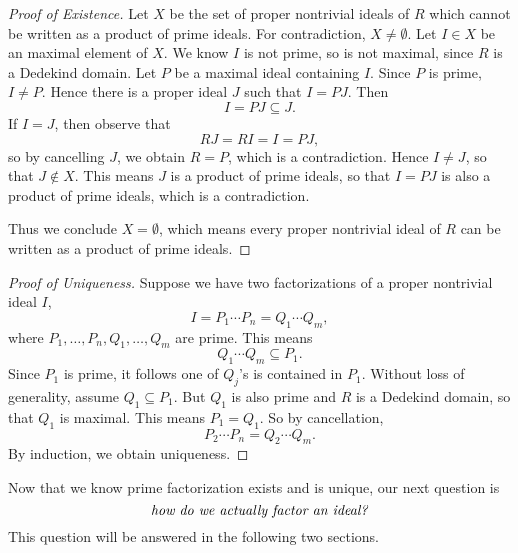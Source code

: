 \documentclass[pmath441]{subfiles}
\begin{document}
    \begin{proof}[Proof of Existence]\qedplacedtrue
        Let $X$ be the set of proper nontrivial ideals of $R$ which cannot be written as a product of prime ideals. For contradiction, $X\neq\emptyset$. Let $I\in X$ be an maximal element of $X$. We know $I$ is not prime, so is not maximal, since $R$ is a Dedekind domain. Let $P$ be a maximal ideal containing $I$. Since $P$ is prime, $I\neq P$. Hence there is a proper ideal $J$ such that $I = PJ$. Then
        \begin{equation*}
            I = PJ \subseteq J.
        \end{equation*}
        If $I = J$, then observe that
        \begin{equation*}
            RJ = RI = I = PJ,
        \end{equation*}
        so by cancelling $J$, we obtain $R=P$, which is a contradiction. Hence $I\neq J$, so that $J\notin X$. This means $J$ is a product of prime ideals, so that $I = PJ$ is also a product of prime ideals, which is a contradiction.

        Thus we conclude $X=\emptyset$, which means every proper nontrivial ideal of $R$ can be written as a product of prime ideals.
    \end{proof}

    \begin{proof}[Proof of Uniqueness]
        Suppose we have two factorizations of a proper nontrivial ideal $I$,
        \begin{equation*}
            I = P_1\cdots P_n = Q_1\cdots Q_m,
        \end{equation*}
        where $P_1,\ldots,P_n,Q_1,\ldots,Q_m$ are prime. This means
        \begin{equation*}
            Q_1\cdots Q_m \subseteq P_1.
        \end{equation*}
        Since $P_1$ is prime, it follows one of $Q_j$'s is contained in $P_1$. Without loss of generality, assume $Q_1\subseteq P_1$. But $Q_1$ is also prime and $R$ is a Dedekind domain, so that $Q_1$ is maximal. This means $P_1 = Q_1$. So by cancellation,
        \begin{equation*}
            P_2\cdots P_n = Q_2\cdots Q_m.
        \end{equation*}
        By induction, we obtain uniqueness.
    \end{proof}

    \np Now that we know prime factorization exists and is unique, our next question is
    \begin{equation*}
        \text{\textit{how do we actually factor an ideal?}}
    \end{equation*}
    This question will be answered in the following two sections.
\end{document}
